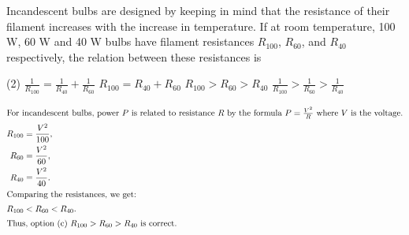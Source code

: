 
\item Incandescent bulbs are designed by keeping in mind that the resistance of their filament increases with the increase in temperature. If at room temperature, 100 W, 60 W and 40 W bulbs have filament resistances \( R_{100} \), \( R_{60} \), and \( R_{40} \) respectively, the relation between these resistances is
    \begin{tasks}(2)
        \task \( \frac{1}{R_{100}} = \frac{1}{R_{40}} + \frac{1}{R_{60}} \)
        \task \( R_{100} = R_{40} + R_{60} \)
        \task \( R_{100} > R_{60} > R_{40} \)
        \task \( \frac{1}{R_{100}} > \frac{1}{R_{60}} > \frac{1}{R_{40}} \)
    \end{tasks}
    \begin{solution}
        \begin{align*}
            \intertext{For incandescent bulbs, power $P$ is related to resistance $R$ by the formula $P=\frac{V^2}{R}$ where $V$ is the voltage.}
            R_{100}&=\frac{V^2}{100},\\
            R_{60}&=\frac{V^2}{60},\\
            R_{40}&=\frac{V^2}{40}.\\
            \intertext{Comparing the resistances, we get:}
            R_{100}&<R_{60}<R_{40}.\\
            \intertext{Thus, option (c) \( R_{100} > R_{60} > R_{40} \) is correct.}
        \end{align*}
    \end{solution}
